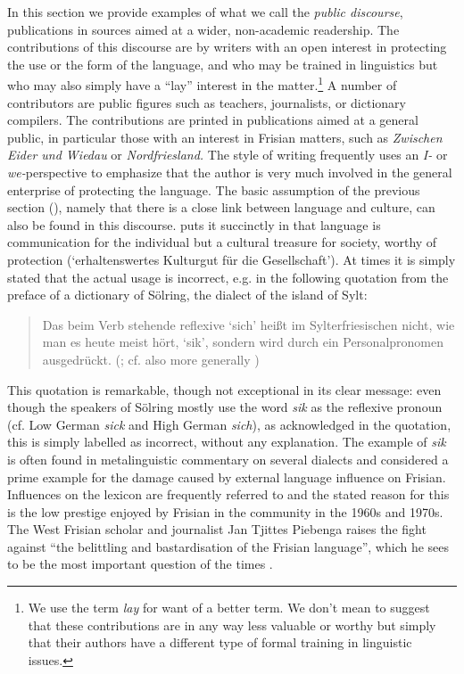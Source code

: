 \documentclass[output=paper]{langsci/langscibook}
\begin{document}
In this section we provide examples of what we call the \textit{public discourse}, publications in sources aimed at a wider, non-academic readership. The contributions of this discourse are by writers with an open interest in protecting the use or the form of the language, and who may be trained in linguistics but who may also simply have a “lay” interest in the matter.\footnote{We use the term \textit{lay} for want of a better term. We don’t mean to suggest that these contributions are in any way less valuable or worthy but simply that their authors have a different type of formal training in linguistic issues.} A number of contributors are public figures such as teachers, journalists, or dictionary compilers. The contributions are printed in publications aimed at a general public, in particular those with an interest in Frisian matters, such as \textit{Zwischen Eider und Wiedau} or \textit{Nordfriesland.} The style of writing frequently uses an \textit{I-} or \textit{we-}perspective to emphasize that the author is very much involved in the general enterprise of protecting the language. The basic assumption of the previous section (), namely that there is a close link between language and culture, can also be found in this discourse. \citet{Holander1969} puts it succinctly in that language is communication for the individual but a cultural treasure for society, worthy of protection (‘erhaltenswertes Kulturgut für die Gesellschaft’). At times it is simply stated that the actual usage is incorrect, e.g. in the following quotation from the preface of a dictionary of Sölring, the dialect of the island of Sylt: 

\begin{quote}
Das beim Verb stehende reflexive ‘sich’ heißt im Sylterfriesischen nicht, wie man es heute meist hört, ‘sik’, sondern wird durch ein Personalpronomen ausgedrückt. (\citealt{Schmidt1972}; cf. also more generally \citealt{BosseLanger2021})\bigskip\\
\end{quote}

This quotation is remarkable, though not exceptional in its clear message: even though the speakers of Sölring mostly use the word \textit{sik} as the reflexive pronoun (cf. Low German \textit{sick} and High German \textit{sich}), as acknowledged in the quotation, this is simply labelled as incorrect, without any explanation. The example of \textit{sik} is often found in metalinguistic commentary on several dialects and considered a prime example for the damage caused by external language influence on Frisian. Influences on the lexicon are frequently referred to and the stated reason for this is the low prestige enjoyed by Frisian in the community in the 1960s and 1970s. The West Frisian scholar and journalist Jan Tjittes Piebenga raises the fight against “the belittling and bastardisation of the Frisian language”, which he sees to be the most important question of the times \citep[11]{Piebenga1966}. 
\end{document}
